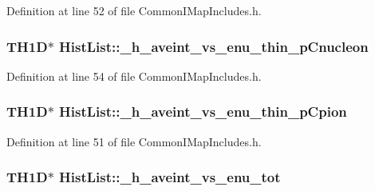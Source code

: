 Definition at line 52 of file Common\-I\-Map\-Includes.\-h.

\hypertarget{struct_hist_list_a8fd8cece486c6f2e808937d0b51da296}{
\subsubsection[{\-\_\-h\-\_\-aveint\-\_\-vs\-\_\-enu\-\_\-thin\-\_\-p\-Cnucleon}]{\setlength{\rightskip}{0pt plus 5cm}T\-H1\-D$\ast$ Hist\-List\-::\-\_\-h\-\_\-aveint\-\_\-vs\-\_\-enu\-\_\-thin\-\_\-p\-Cnucleon}}\label{struct_hist_list_a8fd8cece486c6f2e808937d0b51da296}


Definition at line 54 of file Common\-I\-Map\-Includes.\-h.

\hypertarget{struct_hist_list_a382ef18b8db52f3c710887dee822bde7}{
\subsubsection[{\-\_\-h\-\_\-aveint\-\_\-vs\-\_\-enu\-\_\-thin\-\_\-p\-Cpion}]{\setlength{\rightskip}{0pt plus 5cm}T\-H1\-D$\ast$ Hist\-List\-::\-\_\-h\-\_\-aveint\-\_\-vs\-\_\-enu\-\_\-thin\-\_\-p\-Cpion}}\label{struct_hist_list_a382ef18b8db52f3c710887dee822bde7}


Definition at line 51 of file Common\-I\-Map\-Includes.\-h.

\hypertarget{struct_hist_list_a539ed85865e12fb9d1199c073e311935}{
\subsubsection[{\-\_\-h\-\_\-aveint\-\_\-vs\-\_\-enu\-\_\-tot}]{\setlength{\rightskip}{0pt plus 5cm}T\-H1\-D$\ast$ Hist\-List\-::\-\_\-h\-\_\-aveint\-\_\-vs\-\_\-enu\-\_\-tot}}\label{struct_hist_list_a539ed85865e12fb9d1199c073e311935}


